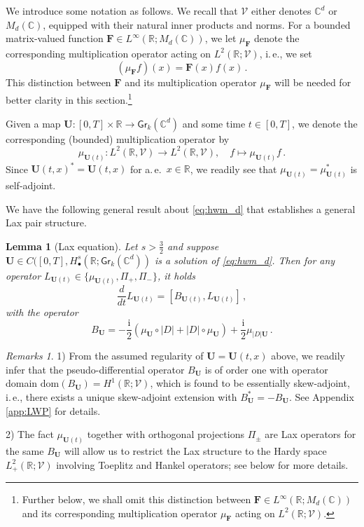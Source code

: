 \documentclass[11pt,reqno]{amsart}
\newtheorem{lem}{Lemma}[section]
\theoremstyle{definition}
\theoremstyle{remark}
\theoremstyle{remark}
\newtheorem*{remarks*}{Remarks}
\numberwithin{equation}{section}
\newcommand{\C}{\mathbb{C}}
\newcommand{\R}{\mathbb{R}}
\newcommand{\VV}{\mathcal{V}}
\newcommand{\dom}{\mathrm{dom}}
\newcommand{\ii}{\mathrm{i}}
\newcommand{\Ub}{\mathbf{U}}
\newcommand{\Ds}{|D|}
\newcommand{\Gr}{\mathsf{Gr}}
\begin{document}
We introduce some notation as follows. We recall that $\VV$ either denotes $\C^d$ or $M_d(\C)$, equipped with their natural inner products and norms.  For a bounded matrix-valued function $\mathbf{F} \in L^\infty(\R; M_d(\C))$, we let $\mu_{\mathbf{F}}$ denote the corresponding multiplication operator acting on $L^2(\R; \VV)$, i.\,e., we set
$$
(\mu_\mathbf{F} f)(x) = \mathbf{F}(x) f(x) \, .
$$ 
This distinction between $\mathbf{F}$ and its multiplication operator $\mu_{\mathbf{F}}$ will be needed for better clarity in this section.\footnote{Further below, we shall omit this distinction between $\mathbf{F} \in L^\infty(\R; M_d(\C))$ and its corresponding multiplication operator $\mu_{\mathbf{F}}$ acting on $L^2(\R; \VV)$.}  

Given a map $\Ub : [0,T] \times \R \to \Gr_k(\C^d)$ and some time $t \in [0,T]$, we denote the corresponding (bounded) multiplication operator by
$$
\mu_{\Ub(t)} : L^2(\R, \VV) \to L^2(\R, \VV), \quad f \mapsto \mu_{\Ub(t)} f \, .
$$ 
Since $\Ub(t,x)^* = \Ub(t,x)$ for a.\,e.~$x \in \R$, we readily see that $\mu_{\Ub(t)}= \mu_{\Ub(t)}^*$ is self-adjoint. 



We have the following general result about \eqref{eq:hwm_d} that establishes a general Lax pair structure.

\begin{lem}[Lax equation] \label{lem:lax}
Let $s > \frac{3}{2}$ and suppose $\Ub \in C([0,T], H^s_\bullet(\R; \Gr_k(\C^d))$ is a solution of \eqref{eq:hwm_d}. Then for any operator $L_{\Ub(t)} \in \{ \mu_{\Ub(t)}, \Pi_+, \Pi_- \}$, it holds
$$
\frac{d}{dt} L_{\Ub(t)} = [B_{\Ub(t)}, L_{\Ub(t)}] \, ,
$$
with the operator 
$$
B_\Ub = -\frac{\ii}{2} ( \mu_{\Ub} \circ \Ds + \Ds \circ \mu_{\Ub}) + \frac{\ii}{2} \mu_{\Ds \Ub} \, .
$$
\end{lem}

\begin{remarks*}
1) From the assumed regularity of $\Ub=\Ub(t,x)$ above, we readily infer that the pseudo-differential operator $B_\Ub$ is of order one with operator domain $\dom(B_\Ub) = H^1(\R; \VV)$, which is found to be essentially skew-adjoint, i.\,e., there exists a unique skew-adjoint extension with $B_\Ub^* = -B_\Ub$. See Appendix \ref{app:LWP} for details.

2) The fact $\mu_{\Ub(t)}$ together with orthogonal projections $\Pi_{\pm}$ are Lax operators for the same $B_\Ub$ will allow us to restrict the Lax structure to the Hardy space $L^2_+(\R; \VV)$ involving Toeplitz and Hankel operators; see below for more details.  
\end{remarks*}
\end{document}
